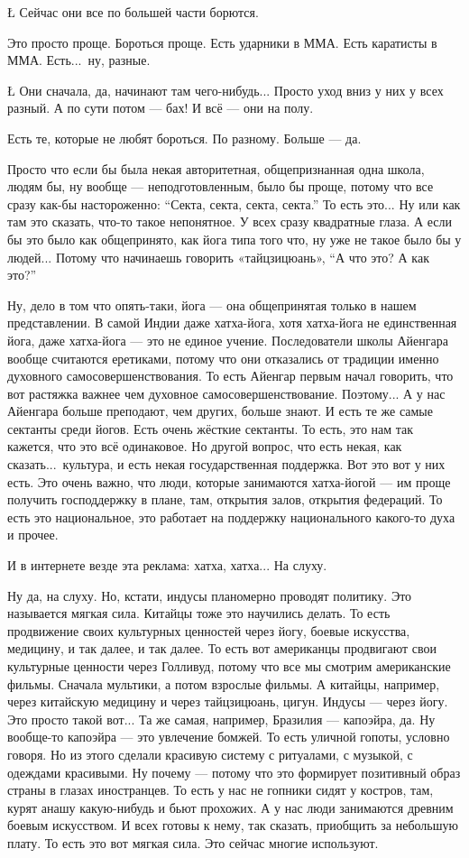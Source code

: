 \L
Сейчас они все по большей части
борются.

\A
Это просто проще.
Бороться проще.
Есть ударники в ММА.
Есть каратисты в ММА.
Есть...\ ну, разные.

\L
Они сначала, да, начинают там чего-нибудь...
Просто уход вниз у них у всех разный.
А по сути потом --- бах!
И всё --- они на полу.

\A
Есть те, которые не любят бороться.
По разному.
Больше --- да.

\I
Просто что
если бы была некая
авторитетная, общепризнанная
одна школа,
людям бы, ну вообще --- неподготовленным,
было бы проще,
потому что все сразу
как-бы настороженно:
``Секта, секта, секта, секта.''
То есть это...
Ну или как там это сказать,
что-то такое непонятное.
У всех сразу квадратные глаза.
А если бы это было
как общепринято,
как йога
типа того что,
ну уже не такое было бы у людей...
Потому что начинаешь говорить
«тайцзицюань»,
``А что это?
А как это?''

\A
Ну, дело в том что опять-таки,
йога --- она общепринятая
только в нашем представлении.
В самой Индии
даже хатха-йога,
хотя хатха-йога
не единственная йога,
даже хатха-йога --- это не единое учение.
Последователи школы Айенгара
вообще считаются еретиками,
потому что они отказались
от традиции
именно духовного самосовершенствования.
То есть Айенгар
первым начал говорить,
что вот растяжка важнее
чем духовное самосовершенствование.
Поэтому...
А у нас
Айенгара больше преподают,
чем других,
больше знают.
И есть те же самые сектанты
среди йогов.
Есть очень жёсткие сектанты.
То есть,
это нам так кажется,
что это всё одинаковое.
Но другой вопрос,
что есть некая,
как сказать...\
культура, и есть некая
государственная поддержка.
Вот это вот у них есть.
Это очень важно, что
люди, которые занимаются
хатха-йогой ---
им проще получить
господдержку
в плане, там, открытия залов,
открытия федераций.
То есть это
национальное,
это работает на поддержку
национального какого-то духа
и прочее.

\I
И в интернете везде эта
реклама: хатха, хатха...
На слуху.

\A
Ну да, на слуху.
Но, кстати, индусы
планомерно проводят политику.
Это называется мягкая сила.
Китайцы тоже это научились делать.
То есть продвижение
своих культурных ценностей
через йогу,
боевые искусства,
медицину, и так далее, и так далее.
То есть вот американцы
продвигают свои культурные ценности
через Голливуд,
потому что все мы смотрим
американские фильмы.
Сначала мультики,
а потом взрослые фильмы.
А китайцы, например,
через китайскую медицину
и через тайцзицюань, цигун.
Индусы --- через йогу.
Это просто
такой вот...
Та же самая,
например,
Бразилия ---
капоэйра,
да.
Ну вообще-то
капоэйра --- это
увлечение бомжей.
То есть
уличной гопоты,
условно говоря.
Но из этого сделали
красивую систему
с ритуалами,
с музыкой,
с одеждами красивыми.
Ну почему ---
потому что
это
формирует позитивный образ страны
в глазах иностранцев.
То есть у нас не гопники
сидят у костров,
там, курят
анашу какую-нибудь
и бьют прохожих.
А у нас люди занимаются
древним боевым искусством.
И всех готовы к нему,
так сказать,
приобщить за небольшую плату.
То есть это вот
мягкая сила.
Это сейчас многие используют.

